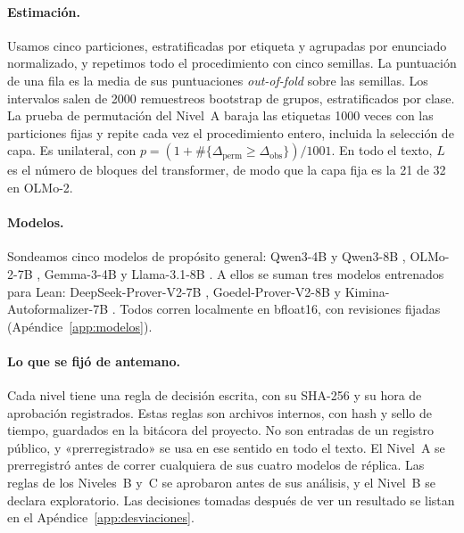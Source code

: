 \documentclass[10pt]{article}
\newcommand{\D}{\Delta}
\begin{document}
\paragraph{Estimación.}
Usamos cinco particiones, estratificadas por etiqueta y agrupadas por enunciado normalizado, y repetimos todo el
procedimiento con cinco semillas. La puntuación de una fila es la media de sus puntuaciones \emph{out-of-fold}
sobre las semillas. Los intervalos salen de 2000 remuestreos bootstrap de grupos, estratificados por clase. La
prueba de permutación del Nivel~A baraja las etiquetas 1000 veces con las particiones fijas y repite cada vez el
procedimiento entero, incluida la selección de capa. Es unilateral, con
$p = (1 + \#\{\D_{\mathrm{perm}} \ge \D_{\mathrm{obs}}\})/1001$. En todo el texto, $L$ es el número de bloques del
transformer, de modo que la capa fija es la 21 de 32 en OLMo-2.

\paragraph{Modelos.}
Sondeamos cinco modelos de propósito general: Qwen3-4B y Qwen3-8B \citep{qwen3}, OLMo-2-7B \citep{olmo2},
Gemma-3-4B \citep{gemma3} y Llama-3.1-8B \citep{llama3}. A ellos se suman tres modelos entrenados para Lean:
DeepSeek-Prover-V2-7B \citep{deepseekproverv2}, Goedel-Prover-V2-8B \citep{goedelproverv2} y
Kimina-Autoformalizer-7B \citep{kimina,kiminaautoformalizer}. Todos corren localmente en bfloat16, con
revisiones fijadas (Apéndice~\ref{app:modelos}).

\paragraph{Lo que se fijó de antemano.}
Cada nivel tiene una regla de decisión escrita, con su SHA-256 y su hora de aprobación registrados. Estas reglas son
archivos internos, con hash y sello de tiempo, guardados en la bitácora del proyecto. No son entradas de un registro
público, y «prerregistrado» se usa en ese sentido en todo el texto. El Nivel~A se prerregistró antes de correr
cualquiera de sus cuatro modelos de réplica. Las reglas de los Niveles~B y~C se aprobaron antes de sus análisis, y
el Nivel~B se declara exploratorio. Las decisiones tomadas después de ver un resultado se listan en el
Apéndice~\ref{app:desviaciones}.
\end{document}
